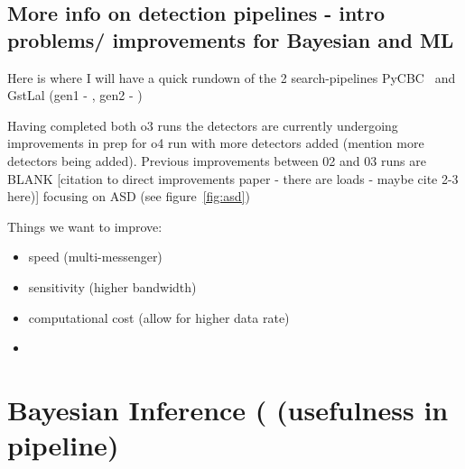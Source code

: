 \documentclass[11pt]{article}
\begin{document}
\subsection{More info on detection pipelines - intro problems/ improvements for Bayesian and ML}

Here is where I will have a quick rundown of the 2 search-pipelines PyCBC~\cite{pycbc2016} and GstLal (gen1 - \cite{gstlal_gen1_2017}, gen2 - \cite{gstlal_gen2_2019})


Having completed both o3 runs the detectors are currently undergoing improvements in prep for o4 run with more detectors added (mention more detectors being added). Previous improvements between 02 and 03 runs are BLANK [citation to direct improvements paper - there are loads - maybe cite 2-3 here)] focusing on ASD (see figure~\ref{fig:asd})

Things we want to improve:
\begin{itemize}
    \item speed (multi-messenger)
    \item sensitivity (higher bandwidth)
    \item computational cost (allow for higher data rate)
    \item 
    
\end{itemize}











\section{Bayesian Inference ( (usefulness in pipeline)}
\end{document}
